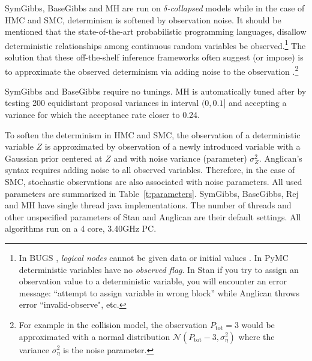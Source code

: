 \documentclass[]{article}
\begin{document}
SymGibbs, BaseGibbs and MH are run on \emph{$\delta$-collapsed} models while in the case of HMC and SMC, determinism is softened by observation noise. %
It should be mentioned that 
the state-of-the-art probabilistic programming languages,
disallow deterministic relationships among continuous random variables 
be observed.\footnote{
In BUGS \citep{lunn2009bugs}, \emph{logical nodes} cannot be given data or initial values .
In PyMC \citep{patil2010pymc} deterministic variables have no \emph{observed flag}. 
In Stan \citep{stan-manual:2014} 
if you try to assign an observation value to a deterministic variable, you will encounter an error message: 
``attempt to assign variable in wrong block'' while 
Anglican \citep{wood2014new} throws error ``invalid-observe", etc.}
The solution that these off-the-shelf inference frameworks often suggest (or impose) is to approximate the observed determinism via adding noise to the observation 
\citep{patil2010pymc}.\footnote{
For example in the collision model, the observation $P_{\text{tot}} = 3$  would be 
approximated with a normal distribution
{\footnotesize $\mathcal{N}( P_{\text{tot}} - 3, \sigma_\eta^2)$}  
where the variance $\sigma_\eta^2$ is the noise parameter.
}

SymGibbs and BaseGibbs require no tunings. 
MH is automatically tuned after \citep{roberts1997weak} by testing 200 equidistant proposal variances in interval 
$(0, 0.1]$ and accepting a variance for which the acceptance rate closer to 0.24.

To soften the determinism in HMC and SMC,
the observation of a deterministic variable $Z$ %
is approximated by observation of a newly introduced variable 
with a Gaussian prior centered at $Z$ and with noise variance (parameter) $\sigma^2_{Z}$. 
Anglican's syntax requires %
adding noise to all observed variables. Therefore, in the case of SMC, stochastic observations are also associated with noise parameters.
All used parameters are summarized in Table~\ref{t:parameters}. 
SymGibbs, BaseGibbs, Rej and MH have single thread java implementations.
The number of threads and other unspecified parameters of Stan and Anglican are their default settings.   
All algorithms run on a 4 core, 3.40GHz PC.%
\end{document}
